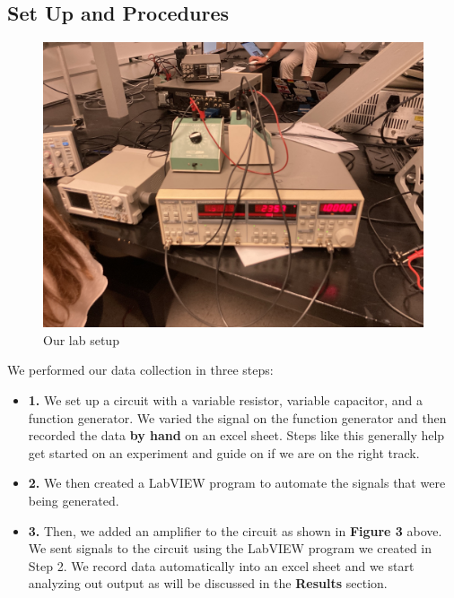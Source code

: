 \documentclass[twocolumn]{article}\usepackage[english]{babel}
\begin{document}
\subsection{Set Up and Procedures}
\begin{figure}
  \includegraphics[width=\linewidth]{images/lab/setup.JPEG}
  \caption{Our lab setup}
  \label{fig:LAB_SETUP}
\end{figure}

We performed our data collection in three steps:
\begin{itemize}
\item{\textbf{1.} We set up a circuit with a variable resistor, variable capacitor, and  a function generator. We varied the signal on the function generator and then recorded the data \textbf{by hand} on an excel sheet. Steps like this generally help get started on an experiment and guide on if we are on the right track.} 
\item{\textbf{2.} We then created a LabVIEW program to automate the signals that were being generated. } \item{\textbf{3.} Then, we added an amplifier to the circuit as shown in \textbf{Figure 3} above. We sent signals to the circuit using the LabVIEW program we created in Step 2. We record data automatically into an excel sheet and we start analyzing out output as will be discussed in the \textbf{Results} section.}
\end{itemize}
\end{document}
